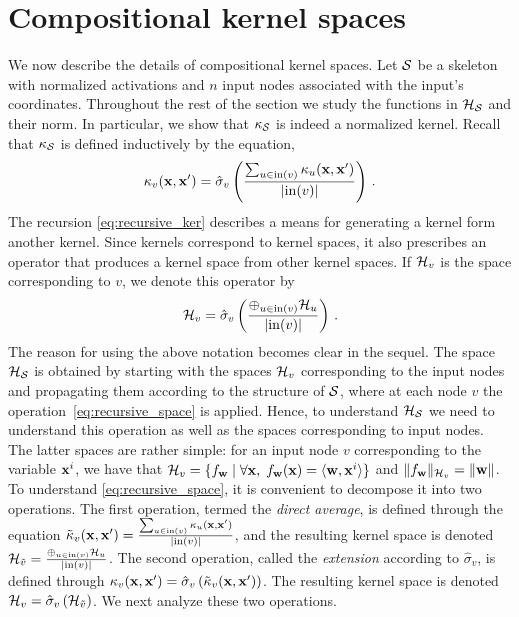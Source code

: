 \section{Compositional kernel spaces}\label{sec:comp_ker}
We now describe the details of compositional kernel spaces. Let ${\cal S}$
be a skeleton with normalized activations and $n$ input nodes associated
with the input's coordinates. Throughout the rest of the section we study
the functions in ${\cal H}_{\cal S}$ and their norm. In particular, we show that
$\kappa_{\cal S}$ is indeed a normalized kernel. Recall that $\kappa_{\cal S}$ is
defined inductively by the equation,
\begin{equation}\label{eq:recursive_ker}
\kappa_v({\mathbf x},{\mathbf x}') = \hat\sigma_v
  \left(
    \frac{\sum_{u\in \mathrm{in}(v)}\kappa_{u}({\mathbf x},{\mathbf x}')}{|\mathrm{in}(v)|}
  \right)\,.
\end{equation}
The recursion \eqref{eq:recursive_ker} describes a means for generating
a kernel form another kernel. Since kernels correspond to kernel spaces,
it also prescribes an operator that produces a kernel space from other kernel
spaces. If ${\cal H}_v$ is the space corresponding to $v$, we denote this
operator by
\begin{equation}\label{eq:recursive_space}
{\cal H}_v=\hat{\sigma}_v\left(\frac{\oplus_{u\in\mathrm{in}(v)}{\cal H}_{u}}{|\mathrm{in}(v)|}\right)\,.
\end{equation}
The reason for using the above notation becomes clear in the sequel. The space
${\cal H}_{\cal S}$ is obtained by starting with the spaces ${\cal H}_{v}$ corresponding to
the input nodes and propagating them according to the structure of ${\cal S}$,
where at each node $v$ the operation~\eqref{eq:recursive_space} is applied.
Hence, to understand ${\cal H}_{\cal S}$ we need to understand this operation
as well as the spaces corresponding to input nodes. The latter spaces are rather simple: for an input node $v$
corresponding to the variable ${\mathbf x}^i$, we have that
$ {\cal H}_v=\{f_{{\mathbf w}}\mid \forall {\mathbf x},\;f_{\mathbf w}({\mathbf x})=\langle {\mathbf w},{\mathbf x}^i \rangle\}$
and
$\|f_{\mathbf w}\|_{{\cal H}_v} = \|{\mathbf w}\|$.
To understand \eqref{eq:recursive_space}, it is
convenient to decompose it into two
operations. The first operation, termed the {\em direct average}, is
defined through the equation $\tilde{\kappa}_v({\mathbf x},{\mathbf x}') =
\frac{\sum_{u\in\mathrm{in}(v)}\kappa_u({\mathbf x},{\mathbf x}')}{|\mathrm{in}(v)|}$, and the resulting kernel
space is denoted ${\cal H}_{\tilde{v}} =
\frac{\oplus_{u\in\mathrm{in}(v)}{\cal H}_{u}}{|\mathrm{in}(v)|}$. The second operation, called
the {\em extension} according to $\hat{\sigma}_v$, is defined through
$\kappa_v({\mathbf x},{\mathbf x}') = \hat{\sigma}_v\left(\tilde{\kappa}_v({\mathbf x},{\mathbf x}')\right)$.
The resulting kernel space is denoted
${\cal H}_{v} = \hat{\sigma}_v\left({\cal H}_{\tilde{v}}\right)$. We next analyze these
two operations.

